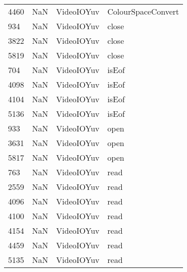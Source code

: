 \begin{tabular}{llll}
4460 &                   NaN &                 VideoIOYuv &                        ColourSpaceConvert \\
934  &                   NaN &                 VideoIOYuv &                                     close \\
3822 &                   NaN &                 VideoIOYuv &                                     close \\
5819 &                   NaN &                 VideoIOYuv &                                     close \\
704  &                   NaN &                 VideoIOYuv &                                     isEof \\
4098 &                   NaN &                 VideoIOYuv &                                     isEof \\
4104 &                   NaN &                 VideoIOYuv &                                     isEof \\
5136 &                   NaN &                 VideoIOYuv &                                     isEof \\
933  &                   NaN &                 VideoIOYuv &                                      open \\
3631 &                   NaN &                 VideoIOYuv &                                      open \\
5817 &                   NaN &                 VideoIOYuv &                                      open \\
763  &                   NaN &                 VideoIOYuv &                                      read \\
2559 &                   NaN &                 VideoIOYuv &                                      read \\
4096 &                   NaN &                 VideoIOYuv &                                      read \\
4100 &                   NaN &                 VideoIOYuv &                                      read \\
4154 &                   NaN &                 VideoIOYuv &                                      read \\
4459 &                   NaN &                 VideoIOYuv &                                      read \\
5135 &                   NaN &                 VideoIOYuv &                                      read \\

\end{tabular}
